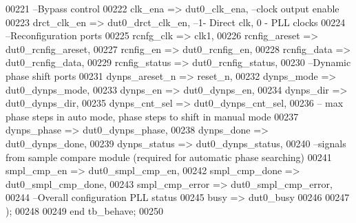 \begin{DoxyCode}
00221 \textcolor{keyword}{   --Bypass control}
00222    clk_ena           => dut0_clk_ena,\textcolor{keyword}{ --clock output enable}
00223    drct_clk_en       => dut0_drct_clk_en,\textcolor{keyword}{ --1- Direct clk, 0 - PLL clocks }
00224 \textcolor{keyword}{   --Reconfiguration ports}
00225    rcnfg_clk         => clk1,
00226    rcnfig_areset     => dut0_rcnfig_areset,
00227    rcnfig_en         => dut0_rcnfig_en,
00228    rcnfig_data       => dut0_rcnfig_data,
00229    rcnfig_status     => dut0_rcnfig_status,
00230 \textcolor{keyword}{   --Dynamic phase shift ports}
00231    dynps_areset_n    => reset_n,
00232    dynps_mode        => dut0_dynps_mode,
00233    dynps_en          => dut0_dynps_en,
00234    dynps_dir         => dut0_dynps_dir,
00235    dynps_cnt_sel     => dut0_dynps_cnt_sel,
00236 \textcolor{keyword}{   -- max phase steps in auto mode, phase steps to shift in manual mode }
00237    dynps_phase       => dut0_dynps_phase,
00238    dynps_done        => dut0_dynps_done,
00239    dynps_status      => dut0_dynps_status,
00240 \textcolor{keyword}{   --signals from sample compare module (required for automatic phase searching)}
00241    smpl_cmp_en       => dut0_smpl_cmp_en,
00242    smpl_cmp_done     => dut0_smpl_cmp_done,
00243    smpl_cmp_error    => dut0_smpl_cmp_error,
00244 \textcolor{keyword}{   --Overall configuration PLL status}
00245    busy              => dut0_busy
00246    
00247    \textcolor{vhdlchar}{)};
00248 
00249 \textcolor{keywordflow}{end} \textcolor{vhdlchar}{tb\_behave};
00250 
\end{DoxyCode}
